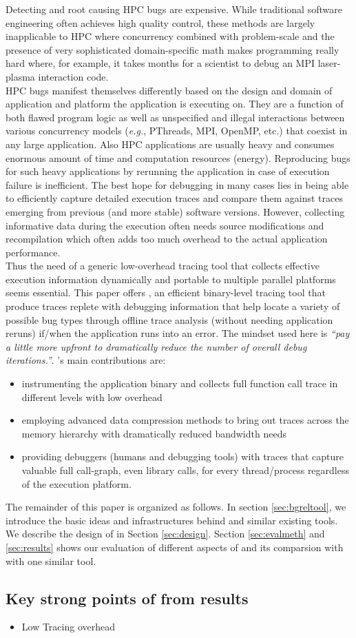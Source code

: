 
Detecting and root causing HPC bugs are expensive. While traditional software engineering often achieves high quality control, these methods are largely inapplicable to HPC where concurrency combined with problem-scale and the presence of very sophisticated domain-specific math makes programming really hard where, for example,  it takes months for a scientist to debug an MPI laser-plasma interaction code\cite{hpcdoe}.\\
HPC bugs manifest themselves differently based on the design and domain of application and platform the application is executing on. They are a function of both flawed program logic as well as unspecified and illegal interactions between various concurrency models ({\em e.g.}, PThreads, MPI, OpenMP, etc.) that coexist in any large application. Also HPC applications are usually heavy and consumes enormous amount of time and computation resources (energy). Reproducing bugs for such heavy applications by rerunning the application in case of execution failure is inefficient. The best hope for debugging in many cases lies in being able to efficiently capture detailed execution traces and compare them against traces emerging from previous (and more stable) software versions\cite{cstg}\cite{stat}. However, collecting informative data during the execution often needs source modifications and recompilation which often adds too much overhead to the actual application performance. \\
Thus the need of a generic low-overhead tracing tool that collects effective execution information dynamically and portable to multiple parallel platforms seems essential.
This paper offers \parlot, an efficient binary-level tracing tool that produce traces replete with debugging information that help locate a variety of possible bug types through offline trace analysis (without needing application reruns) if/when the application runs into an error. The mindset used here is \textit{“pay a little more upfront to dramatically reduce the number of overall debug iterations.”}. \parlot 's main contributions are:
\begin{itemize}
\item instrumenting the application binary and collects full function call trace in different levels with low overhead
\item employing advanced data compression methods to bring out traces across the memory hierarchy with dramatically reduced bandwidth needs
\item providing debuggers (humans and debugging tools) with traces that capture valuable full call-graph, even library calls, for every thread/process regardless of the execution platform.
\end{itemize}
The remainder of this paper is organized as follows. In section \ref{sec:bgreltool}, we introduce the basic ideas and infrastructures behind \parlot and similar existing tools. We describe the design of \parlot in Section \ref{sec:design}. Section \ref{sec:evalmeth} and \ref{sec:results} shows our evaluation of different aspects of \parlot and its comparsion with with one similar tool.

\subsection{Key strong points of \parlot from results}

\begin{itemize}
\item Low Tracing overhead
\end{itemize}
